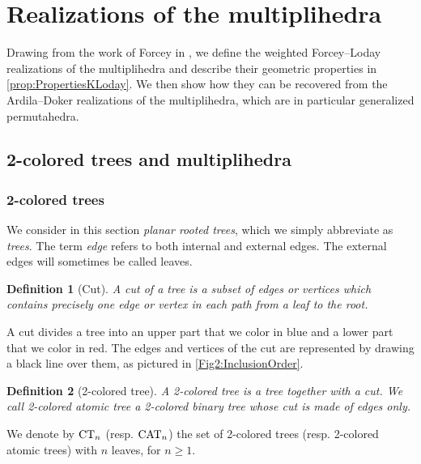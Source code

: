 \documentclass[10pt]{amsart}
\newtheorem{definition}{Definition}[section]
\theoremstyle{remark}
\begin{document}

\section{Realizations of the multiplihedra} 
\label{sec:I}

Drawing from the work of Forcey in \cite{Forcey08}, we define the weighted Forcey--Loday realizations of the multiplihedra and describe their geometric properties in \cref{prop:PropertiesKLoday}.
We then show how they can be recovered from the Ardila--Doker realizations of the multiplihedra, which are in particular generalized permutahedra.


\subsection{2-colored trees and multiplihedra}

\subsubsection{2-colored trees}

We consider in this section \textit{planar rooted trees}, which we simply abbreviate as \textit{trees}. The term \emph{edge} refers to both internal and external edges. The external edges will sometimes be called leaves. 

\begin{definition}[Cut]
A \emph{cut} of a tree is a subset of edges or vertices which contains precisely one edge or vertex in each path from a leaf to the root.
\end{definition}

A cut divides a tree into an upper part that we color in blue and a lower part that we color in red. 
The edges and vertices of the cut are represented by drawing a black line over them, as pictured in \cref{Fig2:InclusionOrder}. 

\begin{definition}[2-colored tree] \label{def:2coloredtree}
A \emph{2-colored tree} is a tree together with a cut. We call \emph{2-colored atomic tree} a 2-colored binary tree whose cut is made of edges only. 
\end{definition}
We denote by $\mathrm{CT}_{n}$ (resp. $\mathrm{CAT}_{n}$) the set of 2-colored trees (resp. 2-colored atomic trees) with $n$ leaves, for $n\geq 1$. 
\end{document}
